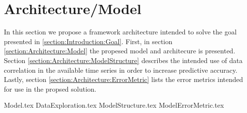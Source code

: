 \chapter{Architecture/Model}
\label{section:Architecture}

In this section we propose a framework architecture intended to solve the goal presented in \ref{section:Introduction:Goal}.
First, in section \ref{section:Architecture:Model} the propesed model and architecure is presented.
Section \ref{section:Architecture:ModelStructure} describes the intended use of data correlation in the available time series in order to increase predictive accuracy.
Lastly, section \ref{section:Architecture:ErrorMetric} lists the error metrics intended for use in the propsed solution. 

{Model.tex}
{DataExploration.tex}
{ModelStructure.tex}
{ModelErrorMetric.tex}


\iffalse
Here you will present the architecture or model that you have chosen and that is (or will be) implemented in your work. Note that putting algorithms in your report is not desirable but in certain cases these might be placed in the appendix. Code further be avoided in the report itself but may be delivered in the fashion requested by the supervisor or, in the case of masters delivery, submitted as additional documents. 
\fi
